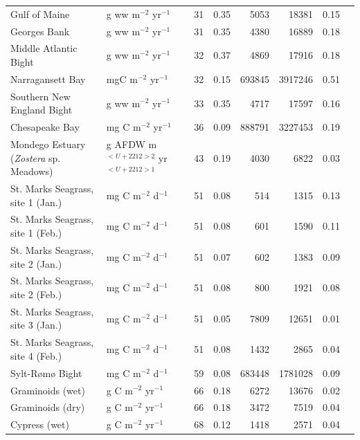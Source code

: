 \documentclass[article]{jss}
\begin{document}
\begin{table}[ht]
\begin{center}
\begin{tiny}
\begin{tabular}{llrrrrrr}
      Gulf of Maine & g ww m$^{-2}$ yr$^{-1}$  &  31 & 0.35 & 5053 & 18381 & 0.15 &   \citet{link08} \\
      Georges Bank & g ww m$^{-2}$ yr$^{-1}$  &  31 & 0.35 & 4380 & 16889 & 0.18 &  \citet{link08} \\
      Middle Atlantic Bight & g ww m$^{-2}$ yr$^{-1}$  &  32 & 0.37 & 4869 & 17916 & 0.18 &  \citet{link08} \\
      Narragansett Bay & mgC m$^{-2}$ yr$^{-1}$  &  32 & 0.15 & 693845 & 3917246 & 0.51 &  \citet{monaco97} \\
      Southern New England Bight & g ww m$^{-2}$ yr$^{-1}$  &  33 & 0.35 & 4717 & 17597 & 0.16 &  \citet{link08} \\
      Chesapeake Bay  & mg C m$^{-2}$ yr$^{-1}$  &  36 & 0.09 & 888791 & 3227453 & 0.19 &  \citet{baird89} \\
      Mondego Estuary (\textit{Zostera} sp. Meadows) & g AFDW m$^{<U+2212>2}$ yr$^{<U+2212>1}$ &  43 & 0.19 & 4030 & 6822 & 0.03 & \citet{patricio2006mass} \\
      St. Marks Seagrass, site 1 (Jan.) & mg C m$^{-2}$ d$^{-1}$  &  51 & 0.08 & 514 & 1315 & 0.13 &  \citet{baird98} \\
      St. Marks Seagrass, site 1 (Feb.) & mg C m$^{-2}$ d$^{-1}$  &  51 & 0.08 & 601 & 1590 & 0.11 &  \citet{baird98} \\
      St. Marks Seagrass, site 2 (Jan.) & mg C m$^{-2}$ d$^{-1}$  &  51 & 0.07 & 602 & 1383 & 0.09 &  \citet{baird98} \\
      St. Marks Seagrass, site 2 (Feb.) & mg C m$^{-2}$ d$^{-1}$  &  51 & 0.08 & 800 & 1921 & 0.08 &  \citet{baird98} \\
      St. Marks Seagrass, site 3 (Jan.) & mg C m$^{-2}$ d$^{-1}$  &  51 & 0.05 & 7809 & 12651 & 0.01 & \citet{baird98} \\
      St. Marks Seagrass, site 4 (Feb.) & mg C m$^{-2}$ d$^{-1}$  &  51 & 0.08 & 1432 & 2865 & 0.04 &  \citet{baird98} \\
      Sylt-R{\o}m{\o} Bight & mg C m$^{-2}$ d$^{-1}$  &  59 & 0.08 & 683448 & 1781028 & 0.09 &  \citet{baird04_sylt} \\
      Graminoids (wet) & g C m$^{-2}$ yr$^{-1}$  &  66 & 0.18 & 6272 & 13676 & 0.02 &  \citet{ulanowicz00_graminoids} \\
      Graminoids (dry) & g C m$^{-2}$ yr$^{-1}$  &  66 & 0.18 & 3472 & 7519 & 0.04 &   \citet{ulanowicz00_graminoids} \\
      Cypress (wet) & g C m$^{-2}$ yr$^{-1}$  &  68 & 0.12 & 1418 & 2571 & 0.04 &  \citet{ulanowicz97_cypress} \\

\end{tabular}
\end{tiny}
\end{center}
\end{table}
\end{document}
